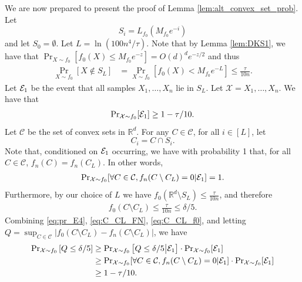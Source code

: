 \documentclass[final,12pt]{colt2018}
\newcommand{\nnew}[1]{{\color{red} #1}}
\newcommand{\nnew}[1]{#1}
\newtheorem{informal theorem}[theorem]{Theorem (informal statement)}
\newcommand{\R}{\mathbb{R}}
\newcommand{\eps}{\epsilon}
\begin{document}
We are now prepared to present the proof of Lemma \ref{lem:alt_convex_set_prob}.
Let 
\[
S_i = L_{f_0}(M_{f_0} e^{-i})
\]
and let $S_0 = \emptyset$.
\nnew{
Let $L = \ln(100 n^4/\tau)$. Note that by Lemma \ref{lem:DKS1}, we have that ${\Pr}_{X\sim f_0}[f_0(X) \leq M_{f_0} e^{-z}] = O(d)^d e^{-z/2}$ and thus
\begin{align*}
{\Pr}_{X\sim f_0}[X \notin S_L] &= {\Pr}_{X\sim f_0}[f_0(X) < M_{f_0} e^{-L}] \leq \frac{\tau}{10n}.
\end{align*}
Let ${\cal E}_1$ be the event that all samples  {$X_1, \ldots, X_n$} lie in $S_L$. 
Let $\mathcal{X} = X_1, \ldots, X_n$.
We have that
\begin{align}
 {{\Pr}_{\mathcal{X}\sim f_0}[{\cal E}_1] \geq 1-\tau/10.} \label{eq:pr_E4}
\end{align}
} 
\nnew{
Let $\mathcal{C}$ be the set of convex sets in $\mathbb{R}^d$.
For any $C \in \mathcal{C}$, for all $i \in [L]$, let 
\[
C_i = C \cap S_i.
\]
Note that, conditioned on ${\cal E}_1$ occurring, we have with probability 1 that, for all $C \in \mathcal{C}$, $f_n(C) = f_n(C_L)$. In other words, 
\begin{align}
{\Pr}_{\mathcal{X}\sim f_0}[\forall C \in \mathcal{C}, f_n(C \setminus C_L) = 0 |  {{\cal E}_1}] = 1. \label{eq:C_CL_FN}
\end{align}
Furthermore, by our choice of $L$ we have  {$f_0(\R^d \setminus S_L) \leq \frac{\tau}{10n}$}, and therefore
\begin{align}
f_0(C \setminus C_L) \leq \frac{\tau}{10n} \leq \delta / 5. \label{eq:C_CL_f0}
\end{align}
Combining \ref{eq:pr_E4}, \ref{eq:C_CL_FN}, \ref{eq:C_CL_f0}, and letting 
$Q = \sup_{C \in \mathcal{C}} |f_0(C \setminus C_L) - f_n(C \setminus C_L)|$, we have
\begin{align}
{\Pr}_{\mathcal{X}\sim f_0} \left[ Q \leq \delta / 5 \right]
&\geq {\Pr}_{\mathcal{X}\sim f_0} \left[ Q \leq \delta / 5 \big| {{\cal E}_1} \right] \cdot {\Pr}_{\mathcal{X}\sim f_0}[ {{\cal E}_1}] \notag \\
&\geq {\Pr}_{\mathcal{X}\sim f_0}[\forall C \in \mathcal{C}, f_n(C \setminus C_L) = 0 | {\cal E}_1] \cdot {\Pr}_{\mathcal{X}\sim f_0}[ {{\cal E}_1}] \notag \\
&\geq 1 - \tau/10. \label{eq:C_L_bound}
\end{align}
}
\end{document}
